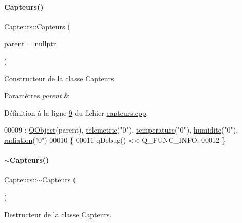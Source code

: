 \paragraph{\texorpdfstring{Capteurs()}{Capteurs()}}
{\footnotesize\ttfamily Capteurs\+::\+Capteurs (\begin{DoxyParamCaption}\item[{\hyperlink{class_q_object}{Q\+Object} $\ast$}]{parent = {\ttfamily nullptr} }\end{DoxyParamCaption})}



Constructeur de la classe \hyperlink{class_capteurs}{Capteurs}. 


\begin{DoxyParams}{Paramètres}
{\em parent} & \\
\hline
\end{DoxyParams}


Définition à la ligne \hyperlink{capteurs_8cpp_source_l00009}{9} du fichier \hyperlink{capteurs_8cpp_source}{capteurs.\+cpp}.


\begin{DoxyCode}
00009                                   : \hyperlink{class_q_object}{QObject}(parent), \hyperlink{class_capteurs_a336a4c4ad6ae1a49d21b265d2953e24b}{telemetrie}(\textcolor{stringliteral}{"0"}), 
      \hyperlink{class_capteurs_acf6f97c1e121ae0f53c9a56430d42dfe}{temperature}(\textcolor{stringliteral}{"0"}), \hyperlink{class_capteurs_a8967c76dbc9c1f2ff8339cb8f00c3adb}{humidite}(\textcolor{stringliteral}{"0"}), \hyperlink{class_capteurs_ad9d6f3fd6cc164c6cd5908fd7822f307}{radiation}(\textcolor{stringliteral}{"0"})
00010 \{
00011     qDebug() << Q\_FUNC\_INFO;
00012 \}
\end{DoxyCode}
\mbox{\label{class_capteurs_a8d0e38fada71279279b2d3938485304b}} 
\paragraph{\texorpdfstring{$\sim$\+Capteurs()}{~Capteurs()}}
{\footnotesize\ttfamily Capteurs\+::$\sim$\+Capteurs (\begin{DoxyParamCaption}{ }\end{DoxyParamCaption})}



Destructeur de la classe \hyperlink{class_capteurs}{Capteurs}. 



